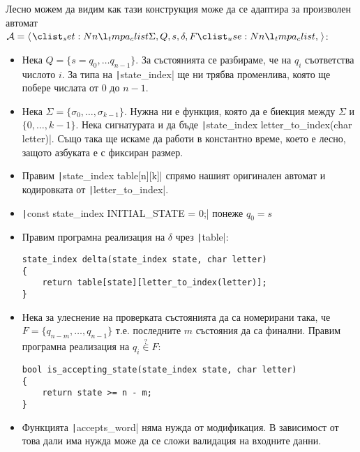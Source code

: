 Лесно можем да видим как тази конструкция може да се адаптира за произволен автомат $\mathcal{A} = \opair{\Sigma, Q, s, \delta, F}$:
\begin{itemize}
    \item Нека $Q = \{ s = q_0, \dots q_{n - 1} \}$.
          За състоянията се разбираме, че на $q_i$ съответства числото $i$.
          За типа на \texttt|state_index| ще ни трябва променлива, която ще побере числата от $0$ до $n - 1$.
    \item Нека $\Sigma = \{ \sigma_0, \dots, \sigma_{k - 1} \}$.
          Нужна ни е функция, която да е биекция между $\Sigma$ и $\{ 0, \dots, k - 1 \}$.
          Нека сигнатурата и да бъде \texttt|state_index letter_to_index(char letter)|.
          Също така ще искаме да работи в константно време, което е лесно, защото азбуката е с фиксиран размер.
    \item Правим \texttt|state_index table[n][k]| спрямо нашият оригинален автомат и кодировката от \texttt|letter_to_index|.
    \item \texttt|const state_index INITIAL_STATE = 0;| понеже $q_0 = s$
    \item Правим програмна реализация на $\delta$ чрез \texttt|table|:
          \begin{verbatim}
state_index delta(state_index state, char letter)
{
    return table[state][letter_to_index(letter)];
}
        \end{verbatim}
    \item Нека за улеснение на проверката състоянията да са номерирани така, че $F = \{ q_{n - m}, \dots, q_{n - 1} \}$ т.е. последните $m$ състояния да са финални.
          Правим програмна реализация на $q_i \stackrel{?}{\in} F$:
          \begin{verbatim}
bool is_accepting_state(state_index state, char letter)
{
    return state >= n - m;
}
          \end{verbatim}
    \item Функцията \texttt|accepts_word| няма нужда от модификация.
          В зависимост от това дали има нужда може да се сложи валидация на входните данни.
\end{itemize}

